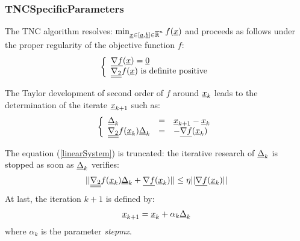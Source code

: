 

\newpage
\subsubsection{TNCSpecificParameters}

The TNC algorithm resolves: $\min_{{\underline{x}} \in [{\underline{a}},{\underline{b}}] \in \overline{{\mathbb R}}^n} f({\underline{x}})$ and proceeds as follows under the proper regularity of the objective function $f$:
\begin{align*}
  \left\{
    \begin{array}{l}
      {\underline{\nabla f}}({\underline{x}}) ={\underline{0}}  \\
      {\underline{\underline{\nabla_2}}} f({\underline{x}}) \mbox{ is definite positive}
    \end{array}
  \right.
\end{align*}

The Taylor development of second order of $f$ around  ${\underline{x}}_k$ leads to the determination of the iterate ${\underline{x}}_{k+1}$ such as:
\begin{equation}\label{linearSystem}
  \left\{
    \begin{array}{lcl}
      {\underline{\Delta}}_k & = & {\underline{x}}_{k+1} - {\underline{x}}_k  \\
      {\underline{\underline{\nabla_2}}} f({\underline{x}}_k){\underline{\Delta}}_k & = & -{\underline{\nabla f}}({\underline{x}}_k)
    \end{array}
  \right.
\end{equation}

The equation (\ref{linearSystem}) is truncated: the iterative research of ${\underline{\Delta}}_k$ is stopped as soon as ${\underline{\Delta}}_k$ verifies:
\begin{align*}
  || {\underline{\underline{\nabla_2}}} f({\underline{x}}_k){\underline{\Delta}}_k + {\underline{\nabla f}}({\underline{x}}_k) || \leq \eta ||{\underline{\nabla f}}({\underline{x}}_k) ||
\end{align*}
At last, the iteration $k+1$ is defined by:
\begin{align*}
  {\underline{x}}_{k+1} = {\underline{x}}_k + \alpha_k {\underline{\Delta}}_k
\end{align*}
where $\alpha_k$ is the parameter \textit{stepmx}.



